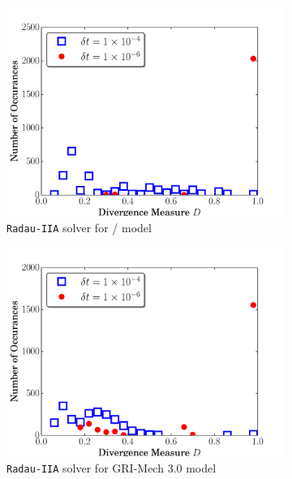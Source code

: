 \documentclass[preprint,review,11pt]{elsarticle}
\begin{document}
\begin{figure}[htbp]
  \centering
  \begin{subfigure}{0.49\textwidth}
      \includegraphics[width=\linewidth]{H2_radau2a_div.pdf}
      \caption{\texttt{Radau-IIA} solver for \slash{} model}
      \label{F:Rad_div_h2}
  \end{subfigure}
  \begin{subfigure}{0.49\textwidth}
      \includegraphics[width=\linewidth]{CH4_radau2a_div.pdf}
      \caption{\texttt{Radau-IIA} solver for GRI-Mech 3.0 model}
      \label{F:Rad_div_gri}
  \end{subfigure}
  \\
  \begin{subfigure}{0.49\textwidth}

\end{subfigure}
\end{figure}
\end{document}
